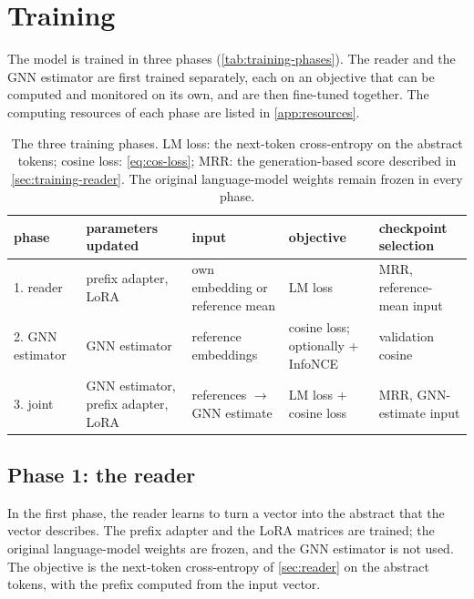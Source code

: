 \section{Training}
\label{sec:training}

The model is trained in three phases (\autoref{tab:training-phases}). The reader and the GNN estimator are first trained separately, each on an objective that can be computed and monitored on its own, and are then fine-tuned together. The computing resources of each phase are listed in \autoref{app:resources}.

\begin{table}[!ht]
  \centering
  \small
  \begin{tabular}{@{}p{2.3cm}p{2.5cm}p{2.8cm}p{2.6cm}p{2.6cm}@{}}
    \toprule
    \raggedright phase & \raggedright parameters updated & \raggedright input & \raggedright objective & \raggedright checkpoint selection \tabularnewline
    \midrule
    \raggedright 1. reader & \raggedright prefix adapter, LoRA & \raggedright own embedding or reference mean & \raggedright LM loss & \raggedright MRR, reference-mean input \tabularnewline
    \raggedright 2. GNN estimator & \raggedright GNN estimator & \raggedright reference embeddings & \raggedright cosine loss; optionally + InfoNCE & \raggedright validation cosine \tabularnewline
    \raggedright 3. joint & \raggedright GNN estimator, prefix adapter, LoRA & \raggedright references $\rightarrow$ GNN estimate & \raggedright LM loss + cosine loss & \raggedright MRR, GNN-estimate input \tabularnewline
    \bottomrule
  \end{tabular}
  \caption{The three training phases. LM loss: the next-token cross-entropy on the abstract tokens; cosine loss: \autoref{eq:cos-loss}; MRR: the generation-based score described in \autoref{sec:training-reader}. The original language-model weights remain frozen in every phase.}
  \label{tab:training-phases}
\end{table}

\subsection{Phase 1: the reader}
\label{sec:training-reader}

In the first phase, the reader learns to turn a vector into the abstract that the vector describes. The prefix adapter and the LoRA matrices are trained; the original language-model weights are frozen, and the GNN estimator is not used. The objective is the next-token cross-entropy of \autoref{sec:reader} on the abstract tokens, with the prefix computed from the input vector.

